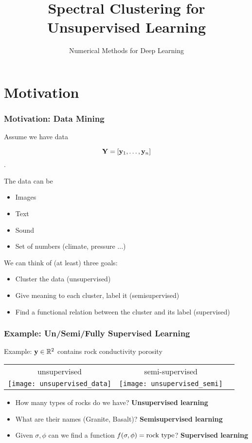 \documentclass[12pt,handout]{beamer}
\title{Spectral Clustering for Unsupervised Learning}
\subtitle{Numerical Methods for Deep Learning}
\date{}
\begin{document}
\makebeamertitle



\section{Motivation} %
\label{sec:motivation}
\begin{frame}
\frametitle{Motivation: Data Mining}


Assume we have data 
  
$${\bf Y} = [{\bf y}_1, \ldots, {\bf y}_n]$$.

The data can be
\begin{itemize}
\item Images
\item Text
\item Sound
\item Set of numbers (climate, pressure ...)
\end{itemize}

\bigskip

We can think of (at least) three goals:
\begin{itemize}
\item Cluster the data (unsupervised)
\item Give meaning to each cluster, label it (semisupervised)
\item Find a functional relation between the cluster and its label (supervised)
\end{itemize}

\end{frame}

\begin{frame}
\frametitle{Example: Un/Semi/Fully Supervised Learning}


Example: ${\bf y} \in \mathbb{R}^2$ contains rock conductivity porosity

\begin{center}
	\begin{tabular}{ccc}
		unsupervised & semi-supervised \\
		\texttt{[image: unsupervised\_data]}&
		\texttt{[image: unsupervised\_semi]}		
	\end{tabular}
\end{center}

\begin{itemize}
\item How many types of rocks do we have? {\bf Unsupervised learning}
\item What are their names (Granite, Basalt)? {\bf Semisupervised learning}
\item Given $\sigma, \phi$ can we find a function $f(\sigma,\phi) = {\rm rock\ type}$? {\bf Supervised learning}
\end{itemize}


\end{frame}
\end{document}
